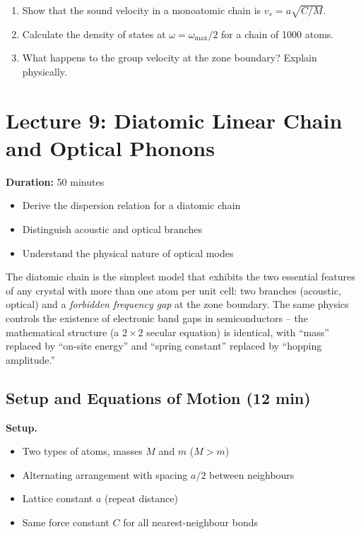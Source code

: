 \documentclass[11pt,a4paper]{article}
\newcommand{\lecheader}[3]{%
  \section{Lecture #1: #2}
  \noindent\textbf{Duration:} #3\par\vspace{4pt}
}
\begin{document}
\begin{probbox}
\begin{enumerate}
\item Show that the sound velocity in a monoatomic chain is $v_s=a\sqrt{C/M}$.
\item Calculate the density of states at $\omega=\omega_{\max}/2$ for a chain of 1000 atoms.
\item What happens to the group velocity at the zone boundary? Explain physically.
\end{enumerate}
\end{probbox}

\newpage
\lecheader{9}{Diatomic Linear Chain and Optical Phonons}{50 minutes}

\begin{keybox}
\begin{itemize}
\item Derive the dispersion relation for a diatomic chain
\item Distinguish acoustic and optical branches
\item Understand the physical nature of optical modes
\end{itemize}
\end{keybox}

\begin{histbox}
The diatomic chain is the simplest model that exhibits the two essential features
of any crystal with more than one atom per unit cell: two branches (acoustic,
optical) and a \emph{forbidden frequency gap} at the zone boundary. The same
physics controls the existence of electronic band gaps in semiconductors -- the
mathematical structure (a $2\times2$ secular equation) is identical, with
``mass'' replaced by ``on-site energy'' and ``spring constant'' replaced by
``hopping amplitude.''
\end{histbox}

\subsection{Setup and Equations of Motion \hfill \small(12 min)}

\textbf{Setup.}
\begin{itemize}
\item Two types of atoms, masses $M$ and $m$ ($M>m$)
\item Alternating arrangement with spacing $a/2$ between neighbours
\item Lattice constant $a$ (repeat distance)
\item Same force constant $C$ for all nearest-neighbour bonds
\end{itemize}
\end{document}
